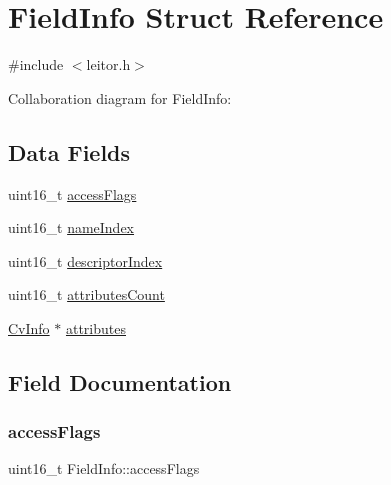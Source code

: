 \hypertarget{structFieldInfo}{}\section{Field\+Info Struct Reference}
\label{structFieldInfo}


{\ttfamily \#include $<$leitor.\+h$>$}



Collaboration diagram for Field\+Info\+:
\subsection*{Data Fields}
\begin{DoxyCompactItemize}
\item 
uint16\+\_\+t \hyperlink{structFieldInfo_a5fd94bd00a430098ff830c231d3f7a53}{access\+Flags}
\item 
uint16\+\_\+t \hyperlink{structFieldInfo_a88ea5c29063df8933d5277e846924b1e}{name\+Index}
\item 
uint16\+\_\+t \hyperlink{structFieldInfo_ab6cc30d06db3569171dd6fdcba7add29}{descriptor\+Index}
\item 
uint16\+\_\+t \hyperlink{structFieldInfo_ad8eae2b3a0fccae8700ca53263983c6e}{attributes\+Count}
\item 
\hyperlink{structCvInfo}{Cv\+Info} $\ast$ \hyperlink{structFieldInfo_a44bc588a62523995db41f7186d6d4253}{attributes}
\end{DoxyCompactItemize}


\subsection{Field Documentation}
\mbox{\label{structFieldInfo_a5fd94bd00a430098ff830c231d3f7a53}} 
\subsubsection{\texorpdfstring{access\+Flags}{accessFlags}}
{\footnotesize\ttfamily uint16\+\_\+t Field\+Info\+::access\+Flags}

\mbox{\label{structFieldInfo_a44bc588a62523995db41f7186d6d4253}} 
